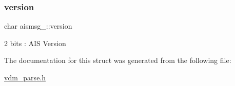 \subsubsection{\texorpdfstring{version}{version}}
{\footnotesize\ttfamily char aismsg\+\_\+::version}



2 bits \+: A\+IS Version 



The documentation for this struct was generated from the following file\+:\begin{DoxyCompactItemize}
\item 
\mbox{\hyperlink{vdm__parse_8h}{vdm\+\_\+parse.\+h}}\end{DoxyCompactItemize}
